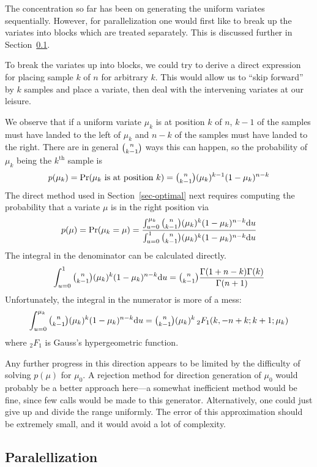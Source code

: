 \documentclass[12pt]{article}
\newcommand{\hyperg}{{{{}_2}{F_1}}}
\newcommand{\du}{{\text{d}u}}
\begin{document}
  The concentration so far has been on generating the uniform
  variates sequentially.  However, for parallelization one
  would first like to break up the variates into blocks which
  are treated separately.  This is discussed further in
  Section~\ref{sec-parallel}.

  To break the variates up into blocks, we could try to
  derive a direct expression for placing sample $k$ of $n$
  for arbitrary $k$.  This would allow us to ``skip forward''
  by $k$ samples and place a variate, then deal with the
  intervening variates at our leisure.

  We observe that if a uniform variate $\mu_k$ is at
  position $k$ of $n$, $k - 1$ of the samples must have landed to the
  left of $\mu_k$ and $n - k$ of the samples must have
  landed to the right.  There are in general $\tbinom{n}{k-1}$
  ways this can happen, so the probability of $\mu_k$ being
  the $k^{\text{th}}$ sample is $$
    p(\mu_k) = \text{Pr}(\mu_k\text{ is at position }k) =
         \tbinom{n}{k - 1}(\mu_k)^{k-1}(1-\mu_k)^{n - k}
  $$
  The direct method used in Section~\ref{sec-optimal}
  next requires computing the probability that a variate
  $\mu$ is in the right position via $$
    p(\mu) = \text{Pr}(\mu_k = \mu) =
      \frac{\int_{u=0}^{\mu_k}{\tbinom{n}{k - 1}(\mu_k)^k(1-\mu_k)^{n - k}}\du}
           {\int_{u=0}^{1}{\tbinom{n}{k - 1}(\mu_k)^k(1-\mu_k)^{n - k}}\du}
  $$
  The integral in the denominator can be calculated
  directly. $$
    \int_{u=0}^{1}{\tbinom{n}{k - 1}(\mu_k)^k(1-\mu_k)^{n - k}}\du = 
        \tbinom{n}{k - 1}\frac{\Gamma(1 + n - k)\Gamma(k)}{\Gamma(n + 1)}
  $$
  Unfortunately, the integral in the numerator is more of a
  mess: $$
    \int_{u=0}^{\mu_k}{\tbinom{n}{k - 1}(\mu_k)^k(1-\mu_k)^{n - k}}\du =
        \tbinom{n}{k - 1}(\mu_k)^k\,\hyperg(k, -n + k; k + 1; \mu_k)
  $$
  where $\hyperg$ is Gauss's hypergeometric function.

  Any further progress in this direction appears to be
  limited by the difficulty of solving $p(\mu)$
  for $\mu_0$.  A rejection method for direction generation
  of $\mu_0$ would probably be a better approach here---a
  somewhat inefficient method would be fine, since few calls
  would be made to this generator.  Alternatively, one could
  just give up and divide the range uniformly.  The error of
  this approximation should be extremely small, and it would
  avoid a lot of complexity.
  
\subsection{Paralellization}\label{sec-parallel}
\end{document}

